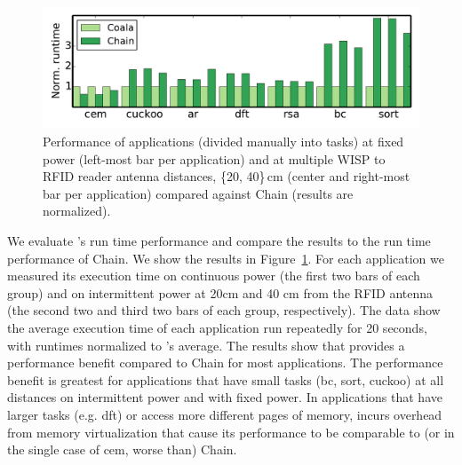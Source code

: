 \begin{figure}
	\centering
	\includegraphics[width=\columnwidth]{figures/coala_chain_clang}
	\caption{Performance of \sys applications (divided manually into tasks) at fixed power (left-most bar per application) and at multiple WISP to RFID reader antenna distances, \{20, 40\}\,cm (center and right-most bar per application) compared against Chain (results are normalized).}
	\label{fig:runtime}
\end{figure}

We evaluate \sys's run time performance and compare the results to the run time
performance of Chain.  We show the results in Figure~\ref{fig:runtime}. For
each application we measured its execution time on continuous power (the first
two bars of each group) and on intermittent power at 20cm and 40 cm from the
RFID antenna (the second two and third two bars of each group, respectively).
The data show the average execution time of each application run repeatedly for 20 seconds, with runtimes normalized to \sys's average.
The results show that \sys provides 
a performance benefit compared to Chain for most applications.  The performance benefit
is greatest for applications that have small tasks (bc,
sort, cuckoo) at all distances on intermittent power and with fixed power. In applications that  
have larger tasks (e.g. dft) or access more different pages of memory, \sys incurs
overhead from memory virtualization that cause its performance to be comparable to
(or in the single case of cem, worse than) Chain. 



